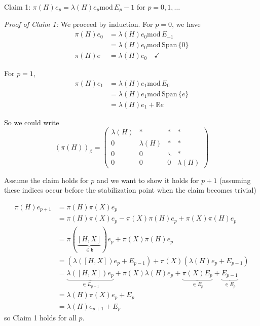\documentclass[12pt]{article}
\newcommand{\R}{\mathbb{R}}
\newcommand{\h}{\mathfrak{h}}
\renewcommand{\mod}{\text{mod}\,}
\newcommand{\Span}{\text{Span}\,}
\newenvironment*{tbox}[2][gray]{
    \begin{tcolorbox}[
        parbox=false,
        colback=#1!5!white,
        colframe=#1!75!black,
        breakable,
        title={#2}
    ]}
    {\end{tcolorbox}}
\begin{document}
\begin{tbox}
        \emph{Claim 1:} $\pi(H)e_p = \lambda(H)e_p \mod E_p - 1$ for $p = 0, 1, \dots$ 

        \emph{Proof of Claim 1:} We proceed by induction. For $p = 0$, we have 
        \begin{align*}
            \pi(H)e_0 &= \lambda(H)e_0 \mod E_{-1}\\ 
                &= \lambda(H)e_0 \mod \Span\{0\}\\ 
            \pi(H)e &= \lambda(H)e_0 \quad \checkmark 
        \end{align*}

        For $p = 1$, 
        \begin{align*}
            \pi(H)e_1 &= \lambda(H)e_1 \mod E_0\\ 
                &= \lambda(H)e_1 \mod \Span\{e\}\\ 
                &= \lambda(H)e_1 + \R e
        \end{align*}

        So we could write 
        \[(\pi(H))_{\beta} = \begin{pmatrix}
            \lambda(H) & * & * & * \\ 
            0 & \lambda(H) & * & *\\ 
            0 & 0 & \ddots & *\\ 
            0 & 0 & 0 & \lambda(H)
        \end{pmatrix}\] 

        Assume the claim holds for $p$ and we want to show it holds for $p +1$ (assuming these indices occur before the stabilization point when the claim becomes trivial) 

        \begin{align*}
            \pi(H)e_{p+1} &= \pi(H)\pi(X)e_p\\ 
                &= \pi(H)\pi(X)e_p - \pi(X)\pi(H)e_p + \pi(X)\pi(H)e_p\\ 
                &= \pi(\underbrace{[H, X]}_{\in \h})e_p + \pi(X)\pi(H)e_p\\ 
                &=\left(\lambda([H, X])e_p + E_{p - 1}\right) + \pi(X)\left(\lambda(H)e_p + E_{p-1}\right)\\ 
                &= \underbrace{\lambda([H, X]) e_p}_{\in E_{p-1}} + \pi(X)\lambda(H)e_p + \underbrace{\pi(X)E_{p}}_{\in E_{p}} + \underbrace{E_{p-1}}_{\in E_{p}}\\
                &= \lambda(H)\pi(X)e_p + E_p\\ 
                &= \lambda(H)e_{p+1} + E_p 
        \end{align*}
        so Claim 1 holds for all $p$. 


\end{tbox}
\end{document}
